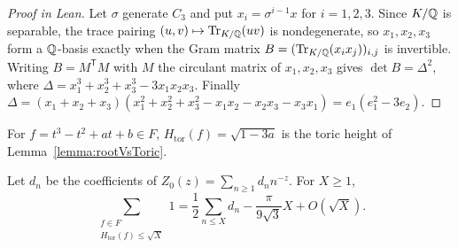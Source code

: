 \begin{proof}[Proof in Lean]

\leanok

Let $\sigma$ generate $C_3$ and put $x_i=\sigma^{i-1}x$ for $i=1,2,3$. Since $K/\mathbb{Q}$ is separable, the trace pairing $(u,v)\mapsto\operatorname{Tr}_{K/\mathbb{Q}}(uv)$ is nondegenerate, so $x_1,x_2,x_3$ form a $\mathbb{Q}$-basis exactly when the Gram matrix $B=(\operatorname{Tr}_{K/\mathbb{Q}}(x_ix_j))_{i,j}$ is invertible. Writing $B=M^{\mathsf T}M$ with $M$ the circulant matrix of $x_1,x_2,x_3$ gives $\det B=\Delta^2$, where $\Delta=x_1^3+x_2^3+x_3^3-3x_1x_2x_3$. Finally $\Delta=(x_1+x_2+x_3)(x_1^2+x_2^2+x_3^2-x_1x_2-x_2x_3-x_3x_1)=e_1(e_1^2-3e_2)$.

\end{proof}

\begin{lemma}

\label{lemma:reducibles}


\leanok

For $f=t^3-t^2+at+b\in F$, $H_{\mathrm{tor}}(f)=\sqrt{1-3a}$ is the toric height of Lemma~\ref{lemma:rootVsToric}.

 Let $d_n$ be the coefficients of $Z_0(z)=\sum_{n\geq1}d_n n^{-z}$. For $X\geq1$, \begin{equation*} \sum_{\substack{f\in F\\H_{\mathrm{tor}}(f)\leq\sqrt X}}1 =\frac12\sum_{n\leq X}d_n -\frac{\pi}{9\sqrt3}X+O(\sqrt X). \end{equation*} 

\end{lemma}

